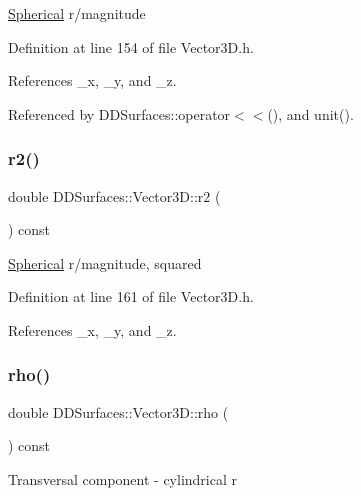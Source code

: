 \hyperlink{struct_d_d_surfaces_1_1_vector3_d_1_1_spherical}{Spherical} r/magnitude 

Definition at line 154 of file Vector3\+D.\+h.



References \+\_\+x, \+\_\+y, and \+\_\+z.



Referenced by D\+D\+Surfaces\+::operator$<$$<$(), and unit().

\hypertarget{class_d_d_surfaces_1_1_vector3_d_a94f8d2cbaced43db5641954ac028356d}{}\label{class_d_d_surfaces_1_1_vector3_d_a94f8d2cbaced43db5641954ac028356d} 
\subsubsection{\texorpdfstring{r2()}{r2()}}
{\footnotesize\ttfamily double D\+D\+Surfaces\+::\+Vector3\+D\+::r2 (\begin{DoxyParamCaption}{ }\end{DoxyParamCaption}) const\hspace{0.3cm}{\ttfamily [inline]}}

\hyperlink{struct_d_d_surfaces_1_1_vector3_d_1_1_spherical}{Spherical} r/magnitude, squared 

Definition at line 161 of file Vector3\+D.\+h.



References \+\_\+x, \+\_\+y, and \+\_\+z.

\hypertarget{class_d_d_surfaces_1_1_vector3_d_a4db116a437a53fbda202b24d995633ff}{}\label{class_d_d_surfaces_1_1_vector3_d_a4db116a437a53fbda202b24d995633ff} 
\subsubsection{\texorpdfstring{rho()}{rho()}}
{\footnotesize\ttfamily double D\+D\+Surfaces\+::\+Vector3\+D\+::rho (\begin{DoxyParamCaption}{ }\end{DoxyParamCaption}) const\hspace{0.3cm}{\ttfamily [inline]}}

Transversal component -\/ cylindrical \textquotesingle{}r\textquotesingle{} 

